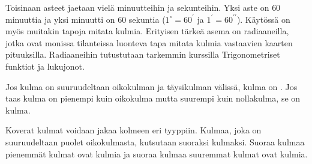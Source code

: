 Toisinaan asteet jaetaan vielä minuutteihin ja sekunteihin. Yksi aste on $60$ minuuttia ja
yksi minuutti on $60$ sekuntia ($1^{\circ} = 60^{\prime}$ ja $1^{\prime} = 
60^{\prime \prime}$).
Käytössä on myös muitakin tapoja mitata kulmia. Erityisen tärkeä asema on radiaaneilla, jotka
ovat monissa tilanteissa luonteva tapa mitata kulmia vastaavien kaarten pituuksilla. Radiaaneihin
tutustutaan tarkemmin kurssilla Trigonometriset funktiot ja lukujonot.


Jos kulma on
suuruudeltaan oikokulman ja täysikulman välissä, kulma on . Jos taas kulma on pienempi
kuin oikokulma mutta suurempi kuin nollakulma, se on  kulma.

Koverat kulmat voidaan jakaa kolmeen eri tyyppiin. Kulmaa, joka on suuruudeltaan puolet
oikokulmasta, kutsutaan suoraksi kulmaksi. Suoraa kulmaa pienemmät kulmat ovat  kulmia ja suoraa kulmaa suuremmat kulmat ovat  kulmia.

